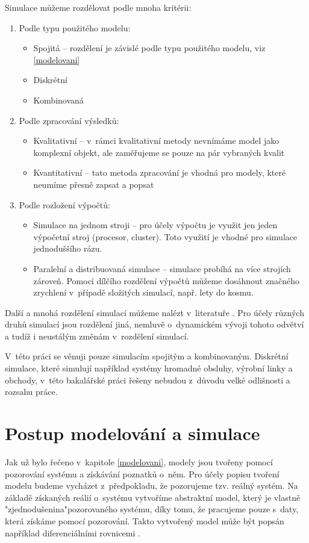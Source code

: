 Simulace můžeme rozdělovat podle mnoha kritérii:
\begin{enumerate}
    \item Podle typu použitého modelu:
        \begin{itemize}
            \item Spojitá -- rozdělení je závislé podle typu použitého modelu, viz \ref{modelovani}
            \item Diskrétní
            \item Kombinovaná
        \end{itemize}
    \item Podle zpracování výsledků:
        \begin{itemize}
            \item Kvalitativní -- v~rámci kvalitativní metody nevnímáme model jako komplexní objekt, ale zaměřujeme se pouze na pár vybraných kvalit
            \item Kvantitativní -- tato metoda zpracování je vhodná pro modely, které neumíme přesně zapsat a popsat
        \end{itemize}
    \item Podle rozložení výpočtů:
        \begin{itemize}
            \item Simulace na jednom stroji -- pro účely výpočtu je využit jen jeden výpočetní stroj (procesor, cluster). Toto využití je vhodné pro simulace jednoduššího rázu.
            \item Paralelní a distribuovaná simulace -- simulace probíhá na více strojích zároveň. Pomocí dílčího rozdělení výpočtů můžeme dosáhnout značného zrychlení v~případě složitých simulací, např. lety do kosmu.
        \end{itemize}
\end{enumerate}
Další a mnohá rozdělení simulací můžeme nalézt v~literatuře \cite{IMS-skripta}. Pro účely různých druhů simulací jsou rozdělení jiná, nemluvě o~dynamickém vývoji tohoto odvětví a tudíž i neustálým změnám v~rozdělení simulací.

V~této práci se věnuji pouze simulacím spojitým a kombinovaným. Diskrétní simulace, které simulují například systémy hromadné obsluhy, výrobní linky a obchody, v~této bakalářské práci řešeny nebudou z~důvodu velké odlišnosti a rozsahu práce. 

\section{Postup modelování a simulace}
Jak už bylo řečeno v~kapitole \ref{modelovani}, modely jsou tvořeny pomocí pozorování systému a získávání poznatků o~něm. Pro účely popisu tvoření modelu budeme vycházet z~předpokladu, že pozorujeme tzv. reálný systém. Na základě získaných reálií o~systému vytvoříme abstraktní model, který je vlastně "zjednodušenina"\space pozorovaného systému, díky tomu, že pracujeme pouze s~daty, která získáme pomocí pozorování. Takto vytvořený model může být popsán například diferenciálními rovnicemi \cite{Cellierc2006}.

